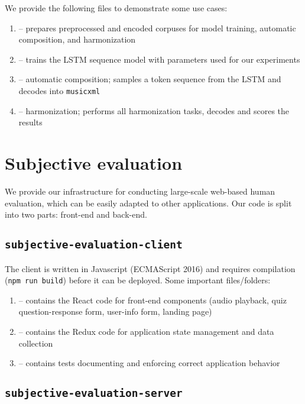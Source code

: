 We provide the following files to demonstrate some use cases:
\begin{enumerate}
    \item {} -- prepares preprocessed and encoded corpuses
        for model training, automatic composition, and harmonization
    \item {} -- trains the LSTM sequence model with parameters used
        for our experiments
    \item {} -- automatic composition; samples a token
        sequence from the LSTM and decodes into \texttt{musicxml}
    \item {} -- harmonization; performs all harmonization tasks,
        decodes and scores the results
\end{enumerate}

\section{Subjective evaluation}

We provide our infrastructure for conducting large-scale web-based human evaluation, which can be
easily adapted to other applications. Our code is split into two parts: front-end and back-end.

\subsection{\texttt{subjective-evaluation-client}}

The client is written in Javascript (ECMAScript 2016) and requires compilation
(\texttt{npm run build}) before it can be deployed. Some important
files/folders:
\begin{enumerate}
    \item {} -- contains the React code for front-end
        components (\eg audio playback, quiz question-response form, user-info
        form, landing page)
    \item {} -- contains the Redux code for application state management
        and data collection
    \item {} -- contains tests documenting and enforcing correct application behavior
\end{enumerate}

\subsection{\texttt{subjective-evaluation-server}}

